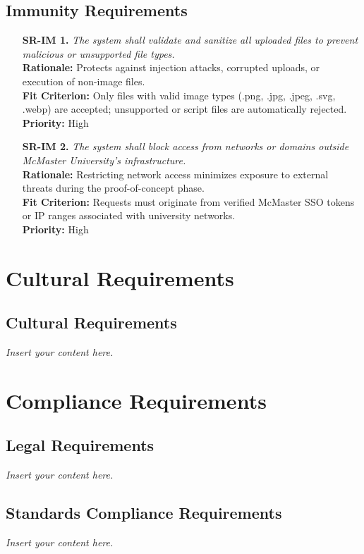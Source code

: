 \documentclass[12pt]{article}
\newcommand{\lips}{\textit{Insert your content here.}}
\begin{document}
\subsection{Immunity Requirements}
\begin{itemize}
    \item[\textbf{SR-IM 1.}] \textit{The system shall validate and sanitize all uploaded files to prevent malicious or unsupported file types.}\\
    \textbf{Rationale:} Protects against injection attacks, corrupted uploads, or execution of non-image files.\\
    \textbf{Fit Criterion:} Only files with valid image types (.png, .jpg, .jpeg, .svg, .webp) are accepted; unsupported or script files are automatically rejected.\\
    \textbf{Priority:} High

    \item[\textbf{SR-IM 2.}] \textit{The system shall block access from networks or domains outside McMaster University’s infrastructure.}\\
    \textbf{Rationale:} Restricting network access minimizes exposure to external threats during the proof-of-concept phase.\\
    \textbf{Fit Criterion:} Requests must originate from verified McMaster SSO tokens or IP ranges associated with university networks.\\
    \textbf{Priority:} High
\end{itemize}

\section{Cultural Requirements}
\subsection{Cultural Requirements}
\lips

\section{Compliance Requirements}
\subsection{Legal Requirements}
\lips
\subsection{Standards Compliance Requirements}
\lips
\end{document}
